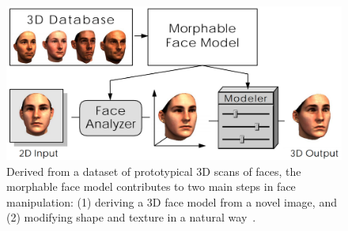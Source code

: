 \begin{figure}[t]
\centering
    \includegraphics[width=1.0\columnwidth]{fig/img/blanz_sig99_face.pdf}
    \caption{Derived from a dataset of prototypical 3D scans of faces, the morphable face model contributes to two main steps in face manipulation: (1) deriving a 3D face model from a novel image, and (2) modifying shape and texture in a natural way~\cite{Blanz:1999:MMS}.}
    \label{fig:blanz_sig99_face}
\end{figure}

